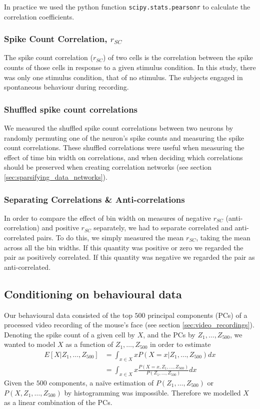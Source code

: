 \documentclass[a4paper,12pt]{article}
\theoremstyle{definition}
\begin{document}
    In practice we used the python function \texttt{scipy.stats.pearsonr} to calculate the correlation coefficients.

        \subsubsection{Spike Count Correlation, $r_{SC}$}\label{sec:spike_count_correlation}
        The spike count correlation ($r_{SC}$) of two cells is the correlation between the spike counts of those cells in response to a given stimulus condition. In this study, there was only one stimulus condition, that of no stimulus. The subjects engaged in spontaneous behaviour during recording.

        \subsubsection{Shuffled spike count correlations}
        We measured the shuffled spike count correlations between two neurons by randomly permuting one of the neuron's spike counts and measuring the spike count correlations. These shuffled correlations were useful when measuring the effect of time bin width on correlations, and when deciding which correlations should be preserved when creating correlation networks (see section \ref{sec:sparsifying_data_networks}). 

        \subsubsection{Separating Correlations \& Anti-correlations}\label{sec:corr_anti_corr} 
        In order to compare the effect of bin width on measures of negative $r_{SC}$ (anti-correlation) and positive $r_{SC}$ separately, we had to separate correlated and anti-correlated pairs. To do this, we simply measured the mean $r_{SC}$, taking the mean across all the bin widths. If this quantity was positive or zero we regarded the pair as positively correlated. If this quantity was negative we regarded the pair as anti-correlated.

    \subsection{Conditioning on behavioural data}
    Our behavioural data consisted of the top $500$ principal components (PCs) of a processed video recording of the mouse's face (see section \ref{sec:video_recordings}). Denoting the spike count of a given cell by $X$, and the PCs by $Z_1,\dots,Z_{500}$, we wanted to model $X$ as a function of $Z_1,\dots,Z_{500}$ in order to estimate
    \begin{align}
      E[X|Z_1,\dots,Z_{500}] &= \int_{x \in X} x P(X=x | Z_1,\dots,Z_{500}) dx \\
        &= \int_{x \in X} x \frac{P(X=x, Z_1,\dots,Z_{500})}{P(Z_1,\dots,Z_{500})} dx
    \end{align}
    Given the $500$ components, a na\"{i}ve estimation of $P(Z_1,\dots,Z_{500})$ or $P(X, Z_1,\dots,Z_{500})$ by histogramming was impossible. Therefore we modelled $X$ as a linear combination of the PCs.
\end{document}
